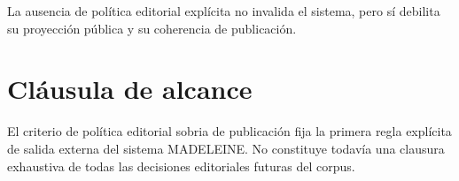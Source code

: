 \begin{observation}
La ausencia de política editorial explícita no invalida el sistema, pero sí debilita su proyección pública y su coherencia de publicación.
\end{observation}

\section{Cláusula de alcance}
\begin{observation}
El criterio de política editorial sobria de publicación fija la primera regla explícita de salida externa del sistema MADELEINE. No constituye todavía una clausura exhaustiva de todas las decisiones editoriales futuras del corpus.
\end{observation}

